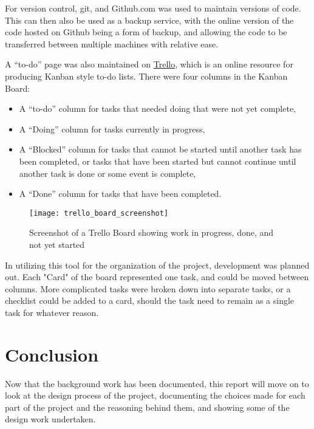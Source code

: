 For version control, git, and Github.com was used to maintain versions of code. This can then also be used as a backup service, with the online version of the code hosted on Github being a form of backup, and allowing the code to be transferred between multiple machines with relative ease.

 A “to-do” page was also maintained on \href{https://trello.com}{Trello}, which is an online resource for producing Kanban style to-do lists. There were four columns in the Kanban Board: 
\begin{itemize}
	\item A “to-do” column for tasks that needed doing that were not yet complete, 
	\item A  “Doing” column for tasks currently in progress, 
	\item A “Blocked” column for tasks that cannot be started until another task has been completed, or tasks that have been started but cannot continue until another task is done or some event is complete,
	\item A “Done” column for tasks that have been completed.
\end{itemize}

\begin{figure}[ht]
	\texttt{[image: trello\_board\_screenshot]}
	\caption{Screenshot of a Trello Board showing work in progress, done, and not yet started}
	\label{fig:trello_screenshot}
\end{figure}

In utilizing this tool for the organization of the project, development was planned out. Each "Card" of the board represented one task, and could be moved between columns. More complicated tasks were broken down into separate tasks, or a checklist could be added to a card, should the task need to remain as a single task for whatever reason.

\section{Conclusion}
Now that the background work has been documented, this report will move on to look at the design process of the project, documenting the choices made for each part of the project and the reasoning behind them, and showing some of the design work undertaken.